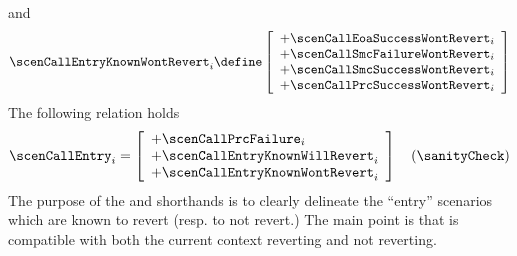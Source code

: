 and
\[
	\scenCallEntryKnownWontRevert _{i} \define
	 \left[ \begin{array}{l}
		+ \scenCallEoaSuccessWontRevert               _{i}    \\
		+ \scenCallSmcFailureWontRevert        _{i}    \\
		+ \scenCallSmcSuccessWontRevert        _{i}    \\
		+ \scenCallPrcSuccessWontRevert        _{i}    \\
	\end{array} \right]
\]
\saNote{}
The following relation holds
\[
	\scenCallEntry_{i}
	=
	 \left[ \begin{array}{l}
	+ \scenCallPrcFailure              _{i} \\
	+ \scenCallEntryKnownWillRevert    _{i} \\
	+ \scenCallEntryKnownWontRevert    _{i} \\
	\end{array} \right]
	\quad (\sanityCheck)
\]
The purpose of the
\scenCallEntryKnownWillRevert{} and
\scenCallEntryKnownWontRevert{}
shorthands is to clearly delineate the ``entry'' scenarios which are known to revert (resp. to not revert.)
The main point is that \scenCallPrcFailure{} is compatible with both the current context reverting and not reverting.

